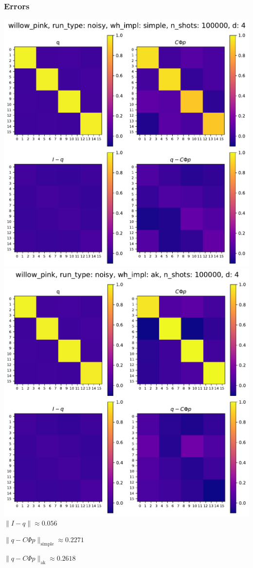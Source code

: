 \documentclass{beamer}
\begin{document}
\begin{frame}
\frametitle{Errors}
\begin{center}
\includegraphics[scale=0.25]{img/q_noisy_simple_100000}\includegraphics[scale=0.25]{img/q_noisy_ak_100000}	$\lVert I - q\rVert \approx 0.056$

$\lVert q - C \Phi p\rVert_{\text{simple}} \approx 0.2271$

$\lVert q - C \Phi p\rVert_{\text{ak}} \approx 0.2618$

\end{center}	
\end{frame}
\end{document}
